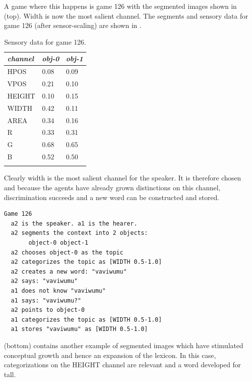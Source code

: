 A game where this happens is game 126 with the segmented images
shown in  (top). Width is now the most salient
channel. The segments and sensory data for game 126 
(after sensor-scaling) are shown in . 
\begin{table}
\begin{center}
\begin{tabular}{ l  l  l }
\lsptoprule
{\it channel}& {\it obj-0} & {\it obj-1}\\ \midrule
HPOS & 0.08 & 0.09\\ \midrule
VPOS & 0.21 & 0.10\\ \midrule
HEIGHT & 0.10 & 0.15\\ \midrule
WIDTH & 0.42 & 0.11\\ \midrule
AREA & 0.34 & 0.16\\ \midrule
R & 0.33 & 0.31\\ \midrule
G & 0.68 & 0.65\\ \midrule
B & 0.52 & 0.50\\ \midrule
\lspbottomrule
\end{tabular}
\caption{ \label{tab:game126} Sensory data for game 126.}
\end{center}
\end{table}
Clearly width is the most salient channel for the speaker. 
It is therefore chosen and because the 
agents have already grown distinctions on this channel, 
discrimination succeeds and a new word can be
constructed and stored. 
\begin{verbatim}
Game 126 
  a2 is the speaker. a1 is the hearer. 
  a2 segments the context into 2 objects: 
       object-0 object-1
  a2 chooses object-0 as the topic 
  a2 categorizes the topic as [WIDTH 0.5-1.0]
  a2 creates a new word: "vaviwumu"
  a2 says: "vaviwumu"
  a1 does not know "vaviwumu"
  a1 says: "vaviwumu?"
  a2 points to object-0
  a1 categorizes the topic as [WIDTH 0.5-1.0]
  a1 stores "vaviwumu" as [WIDTH 0.5-1.0]
\end{verbatim}
 (bottom) contains another example
of segmented images which have stimulated conceptual
growth and hence an expansion of the lexicon. 
In this case, categorizations on the HEIGHT channel are
relevant and a word developed for tall.
